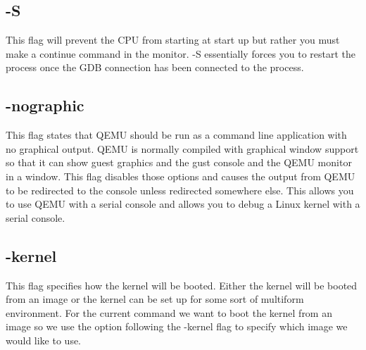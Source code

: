\documentclass[draftclsnofoot, onecolumn, compsoc, 10pt]{IEEEtran}
\begin{document}
	\subsection{-S}
		This flag will prevent the CPU from starting at start up but rather you must make a continue command in the monitor. -S essentially forces you to restart the process once the GDB connection has been connected to the process.\\


	\subsection{-nographic}
		This flag states that QEMU should be run as a command line application with no graphical output. QEMU is normally compiled with graphical window support so that it can show guest graphics and the gust console and the QEMU monitor in a window. This flag disables those options and causes the output from QEMU to be redirected to the console unless redirected somewhere else. This allows you to use QEMU with a serial console and allows you to debug a Linux kernel with a serial console.\\


	\subsection{-kernel}
		This flag specifies how the kernel will be booted. Either the kernel will be booted from an image or the kernel can be set up for some sort of multiform environment. For the current command we want to boot the kernel from an image so we use the option following the -kernel flag to specify which image we would like to use.\\
\end{document}
